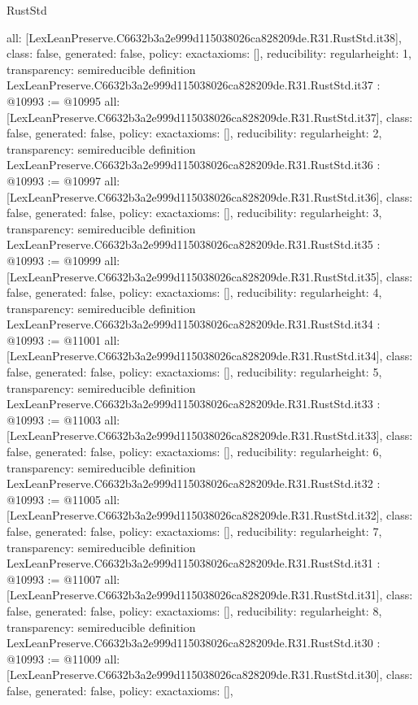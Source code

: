 \begin{lexlean}{RustStd}
\begin{coremodule}
{  all: [LexLeanPreserve.C6632b3a2e999d115038026ca828209de.R31.RustStd.it38],
  class: false,
  generated: false,
  policy: exact{axioms: []},
  reducibility: regular{height: 1},
  transparency: semireducible
}
definition LexLeanPreserve.C6632b3a2e999d115038026ca828209de.R31.RustStd.it37 : @10993 := @10995 {
  all: [LexLeanPreserve.C6632b3a2e999d115038026ca828209de.R31.RustStd.it37],
  class: false,
  generated: false,
  policy: exact{axioms: []},
  reducibility: regular{height: 2},
  transparency: semireducible
}
definition LexLeanPreserve.C6632b3a2e999d115038026ca828209de.R31.RustStd.it36 : @10993 := @10997 {
  all: [LexLeanPreserve.C6632b3a2e999d115038026ca828209de.R31.RustStd.it36],
  class: false,
  generated: false,
  policy: exact{axioms: []},
  reducibility: regular{height: 3},
  transparency: semireducible
}
definition LexLeanPreserve.C6632b3a2e999d115038026ca828209de.R31.RustStd.it35 : @10993 := @10999 {
  all: [LexLeanPreserve.C6632b3a2e999d115038026ca828209de.R31.RustStd.it35],
  class: false,
  generated: false,
  policy: exact{axioms: []},
  reducibility: regular{height: 4},
  transparency: semireducible
}
definition LexLeanPreserve.C6632b3a2e999d115038026ca828209de.R31.RustStd.it34 : @10993 := @11001 {
  all: [LexLeanPreserve.C6632b3a2e999d115038026ca828209de.R31.RustStd.it34],
  class: false,
  generated: false,
  policy: exact{axioms: []},
  reducibility: regular{height: 5},
  transparency: semireducible
}
definition LexLeanPreserve.C6632b3a2e999d115038026ca828209de.R31.RustStd.it33 : @10993 := @11003 {
  all: [LexLeanPreserve.C6632b3a2e999d115038026ca828209de.R31.RustStd.it33],
  class: false,
  generated: false,
  policy: exact{axioms: []},
  reducibility: regular{height: 6},
  transparency: semireducible
}
definition LexLeanPreserve.C6632b3a2e999d115038026ca828209de.R31.RustStd.it32 : @10993 := @11005 {
  all: [LexLeanPreserve.C6632b3a2e999d115038026ca828209de.R31.RustStd.it32],
  class: false,
  generated: false,
  policy: exact{axioms: []},
  reducibility: regular{height: 7},
  transparency: semireducible
}
definition LexLeanPreserve.C6632b3a2e999d115038026ca828209de.R31.RustStd.it31 : @10993 := @11007 {
  all: [LexLeanPreserve.C6632b3a2e999d115038026ca828209de.R31.RustStd.it31],
  class: false,
  generated: false,
  policy: exact{axioms: []},
  reducibility: regular{height: 8},
  transparency: semireducible
}
definition LexLeanPreserve.C6632b3a2e999d115038026ca828209de.R31.RustStd.it30 : @10993 := @11009 {
  all: [LexLeanPreserve.C6632b3a2e999d115038026ca828209de.R31.RustStd.it30],
  class: false,
  generated: false,
  policy: exact{axioms: []},
}
\end{coremodule}
\end{lexlean}

